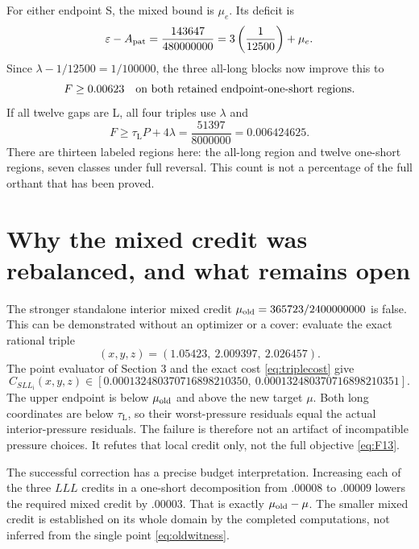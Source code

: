 \documentclass[11pt]{amsart}
\numberwithin{equation}{section}
\newcommand{\eps}{\varepsilon}
\newcommand{\tL}{\tau_{\mathrm L}}
\begin{document}
For either endpoint S, the mixed bound is $\mu_e$. Its deficit
is
\begin{equation}\label{eq:endpointdeficit}
 \eps-A_{\rm pat}=\frac{143647}{480000000}
          =3\left(\frac1{12500}\right)+\mu_e.
\end{equation}
Since $\lambda-1/12500=1/100000$, the three all-long blocks
now improve this to
\begin{equation}\label{eq:endpointconclusion}
 F\geq0.00623
 \quad\hbox{on both retained endpoint-one-short regions}.
\end{equation}
If all twelve gaps are L, all four triples use $\lambda$ and
\begin{equation}\label{eq:alllongconclusion}
 F\geq\tL P+4\lambda
       =\frac{51397}{8000000}=0.006424625.
\end{equation}
There are thirteen labeled regions here: the all-long region and
twelve one-short regions, seven classes under full reversal. This
count is not a percentage of the full orthant that has been proved.

\section{Why the mixed credit was rebalanced, and what remains open}

The stronger standalone interior mixed credit
$\mu_{\rm old}=365723/2400000000$ is false. This can be
demonstrated without an optimizer or a cover: evaluate the exact
rational triple
\begin{equation}\label{eq:oldwitness}
 (x,y,z)=(1.05423,\ 2.009397,\ 2.026457).
\end{equation}
The point evaluator of Section 3 and the exact cost
\eqref{eq:triplecost} give
\begin{equation}\label{eq:oldwitnessvalue}
 C_{SLL_{\mathrm i}}(x,y,z)\in
 [0.000132480370716898210350,\ 0.000132480370716898210351].
\end{equation}
The upper endpoint is below $\mu_{\rm old}$ and above the new
target $\mu$. Both long coordinates are below $\tL$, so their
worst-pressure residuals equal the actual interior-pressure
residuals. The failure is therefore not an artifact of incompatible
pressure choices. It refutes that local credit only, not the full
objective \eqref{eq:F13}.

The successful correction has a precise budget interpretation.
Increasing each of the three $LLL$ credits in a one-short
decomposition from $.00008$ to $.00009$ lowers the required
mixed credit by $.00003$. That is exactly
$\mu_{\rm old}-\mu$. The smaller mixed credit is established
on its whole domain by the completed computations, not inferred
from the single point \eqref{eq:oldwitness}.
\end{document}

